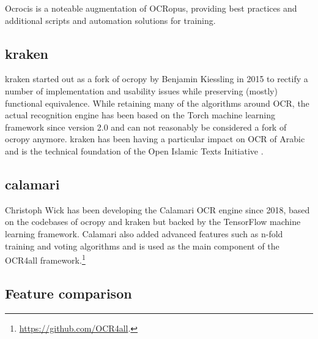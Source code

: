 \documentclass[conference]{IEEEtran}
\begin{document}
Ocrocis is a noteable augmentation of OCRopus, providing best practices and
additional scripts and automation solutions for training.\cite{springmann2015ocrocis}





\subsection{kraken}

kraken \cite{DBLP:journals/corr/RomanovMSK17} started out as a fork of ocropy
by Benjamin Kiessling in 2015 to rectify a number of implementation and usability
issues while preserving (mostly) functional equivalence. While retaining many of
the algorithms around OCR, the actual recognition engine has been based on the
Torch machine learning framework since version 2.0 and can not reasonably be
considered a fork of ocropy anymore. kraken has been having a particular impact
on OCR of Arabic and is the technical foundation of the Open Islamic Texts
Initiative \cite{miller_romanov_savant_2018}.


\subsection{calamari}

Christoph Wick has been developing the Calamari
\cite{DBLP:journals/corr/abs-1807-02004} OCR engine since 2018, based on the
codebases of ocropy and kraken but backed by the TensorFlow machine learning
framework. Calamari also added advanced features such as n-fold training and
voting algorithms and is used as the main component of the OCR4all
framework.\footnote{\url{https://github.com/OCR4all}.}

\subsection{Feature comparison}
\end{document}
